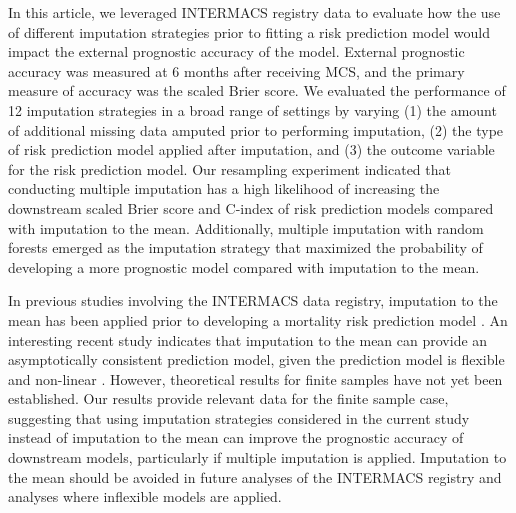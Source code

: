 \documentclass{article}
\begin{document}
In this article, we leveraged INTERMACS registry data to evaluate how
the use of different imputation strategies prior to fitting a risk
prediction model would impact the external prognostic accuracy of the
model. External prognostic accuracy was measured at 6 months after
receiving MCS, and the primary measure of accuracy was the scaled Brier
score. We evaluated the performance of 12 imputation strategies in a
broad range of settings by varying (1) the amount of additional missing
data amputed prior to performing imputation, (2) the type of risk
prediction model applied after imputation, and (3) the outcome variable
for the risk prediction model. Our resampling experiment indicated that
conducting multiple imputation has a high likelihood of increasing the
downstream scaled Brier score and C-index of risk prediction models
compared with imputation to the mean. Additionally, multiple imputation
with random forests emerged as the imputation strategy that maximized
the probability of developing a more prognostic model compared with
imputation to the mean.

In previous studies involving the INTERMACS data registry, imputation to
the mean has been applied prior to developing a mortality risk
prediction model
\cite{hsich2012should, cotts2014predictors, eckman2011survival, kirklin2017eighth, kormos2019society, Adamo950}.
An interesting recent study indicates that imputation to the mean can
provide an asymptotically consistent prediction model, given the
prediction model is flexible and non-linear \cite{josse2019consistency}.
However, theoretical results for finite samples have not yet been
established. Our results provide relevant data for the finite sample
case, suggesting that using imputation strategies considered in the
current study instead of imputation to the mean can improve the
prognostic accuracy of downstream models, particularly if multiple
imputation is applied. Imputation to the mean should be avoided in
future analyses of the INTERMACS registry and analyses where inflexible
models are applied.
\end{document}
